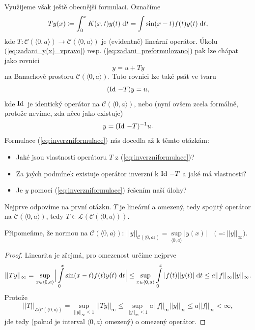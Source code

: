 Využijeme však ještě obecnější formulaci. Označíme
\begin{equation}
    Ty(x)\coloneqq \int_0^x K(x,t)y(t)\;\mathrm{d}t=\int\limits\sin(x-t)f(t)y(t)\;\mathrm{d}t,
    \label{eq:obesnejsiformulaceTy}
\end{equation}
kde $T: \mathcal{C}(\langle 0,a\rangle )\rightarrow \mathcal{C}(\langle 0,a\rangle )$ je (evidentně) lineární operátor. Úkolu (\ref{eq:zadani_y(x)_vpravo}) resp. (\ref{eq:zadani_preformulovano}) pak lze chápat jako rovnici
\begin{equation}
    y=u+Ty
\end{equation}
na Banachově prostoru $\mathcal{C}(\langle 0,a\rangle)$. Tuto rovnici lze také psát ve tvaru
\begin{equation}
    (\operatorname{Id}\,-T)y=u,
\end{equation}
kde $\operatorname{Id}\,$ je identický operátor na $\mathcal{C}(\langle 0,a\rangle)$, nebo (nyní ovšem zcela formálně, protože nevíme, zda něco jako  existuje)
\begin{equation}
    y = (\operatorname{Id}\,-T)^{-1}u.
    \label{eq:inverzniformulace}
\end{equation}
Formulace (\ref{eq:inverzniformulace}) nás docedla až k těmto otázkám:
\begin{itemize}
    \item Jaké jsou vlastnosti operátoru $T$ z (\ref{eq:inverzniformulace})?
    \item Za jaých podmínek existuje operátor inverzní k $\operatorname{Id}\,-T$ a jaké má vlastnosti?
    \item Je $y$  pomocí (\ref{eq:inverzniformulace}) řešením naší úlohy?
\end{itemize}
Nejprve odpovíme na první otázku. $T$ je lineární a omezený, tedy spojitý operátor na $\mathcal{C}(\langle0,a\rangle)$, tedy $T\in\mathscr{L}(\mathcal{C}(\langle0,a\rangle))$.

Připomeňme, že normou na $\mathcal{C}(\langle0,a\rangle)$: $||y||_{\mathcal{C}(\langle0,a\rangle)} = \underset{\langle 0,a\rangle}{\sup} |y(x)| \quad \big(\eqqcolon ||y||_\infty\big)$.

\begin{proof}
Linearita je zřejmá, pro omezenost určíme nejprve
\begin{equation}
    ||Ty||_\infty = \underset{x\in\langle0,a\rangle}{\sup}\Big|\int\limits_0^x\sin(x-t)f(t)y(t)\;\mathrm{d}t\Big|\leq \underset{x\in\langle0,a\rangle}{\sup}\int\limits_0^x|f(t)||y(t)|\;\mathrm{d}t\leq a||f||_\infty||y||_\infty.
\end{equation}
Protože  
\begin{equation}
    ||T||_{\mathscr{L}(\mathcal{C}(\langle0,a\rangle)} = \underset{||y||_\infty\leq1}{\sup}||Ty||_\infty\leq \underset{||y||_\infty\leq1}{\sup} a ||f||_\infty ||y||_\infty\leq a||f||_\infty<\infty,
    \label{eq:omezeniOperatoru}
\end{equation}
jde tedy (pokud je interval $\langle0,a\rangle$ omezený) o omezený operátor.
\end{proof}

